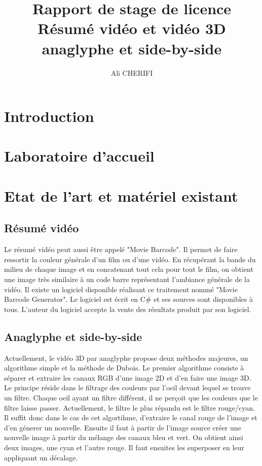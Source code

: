\documentclass[10pt,a4paper]{article}
\author{Ali CHERIFI}
\title{Rapport de stage de licence\\Résumé vidéo et vidéo 3D anaglyphe et side-by-side}
\begin{document}
\maketitle
\newpage
\tableofcontents
\newpage
\section{Introduction}

\section{Laboratoire d'accueil}



\section{Etat de l'art et matériel existant}
\subsection{Résumé vidéo}
Le résumé vidéo peut aussi être appelé "Movie Barcode". Il permet de faire ressortir la couleur générale d'un film ou d'une vidéo. En récupérant la bande du milieu de chaque image et en concatenant tout cela pour
tout le film, on obtient une image très similaire à un code barre représentant l'ambiance générale de la vidéo.
Il existe un logiciel disponible réalisant ce traitement nommé "Movie Barcode Generator". Le logiciel est écrit en C\# et ses sources sont disponibles à tous. L'auteur du logiciel accepte la vente des
résultats produit par son logiciel.

\subsection{Anaglyphe et side-by-side}
Actuellement, le vidéo 3D par anaglyphe propose deux méthodes majeures, un algorithme simple et la méthode de Dubois.
Le premier algorithme consiste à séparer et extraire les canaux RGB d'une image 2D et d'en faire une image 3D. Le principe réside dans le filtrage des couleurs par l'oeil devant lequel se trouve un filtre.
Chaque oeil ayant un filtre différent, il ne perçoit que les couleurs que le filtre laisse passer. Actuellement, le filtre le plus répandu est le filtre rouge/cyan.
Il suffit donc dans le cas de cet algortihme, d'extraire le canal rouge de l'image et d'en génerer un nouvelle. Ensuite il faut à partir de l'image source créer une nouvelle image à partir du mélange des canaux bleu et vert.
On obtient ainsi deux images, une cyan et l'autre rouge. Il faut ensuites les superposer en leur appliquant un décalage.\newline
\end{document}
